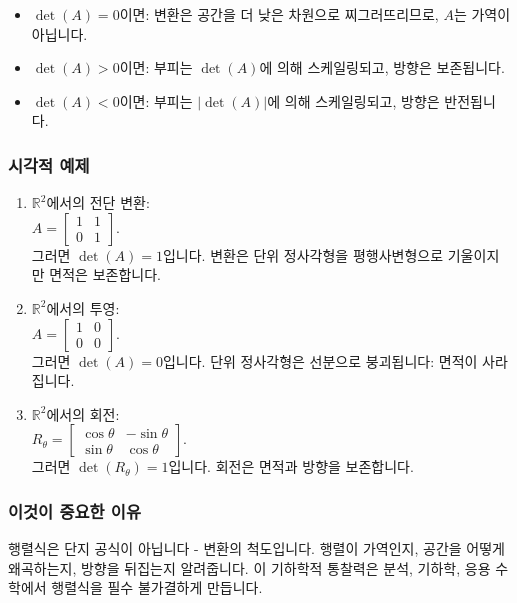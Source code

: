 \documentclass[
  12pt,
  a4paper,
]{article}
\begin{document}
\begin{itemize}
\item
  \(\det(A) = 0\)이면: 변환은 공간을 더 낮은 차원으로 찌그러뜨리므로, \(A\)는 가역이 아닙니다.
\item
  \(\det(A) > 0\)이면: 부피는 \(\det(A)\)에 의해 스케일링되고, 방향은 보존됩니다.
\item
  \(\det(A) < 0\)이면: 부피는 \(|\det(A)|\)에 의해 스케일링되고, 방향은 반전됩니다.
\end{itemize}

\subsubsection{시각적 예제}\label{visual-examples}

\begin{enumerate}
\def\labelenumi{\arabic{enumi}.}
\item
  \(\mathbb{R}^2\)에서의 전단 변환:\\
  \(A = \begin{bmatrix} 1 & 1 \\ 0 & 1 \end{bmatrix}\).\\
  그러면 \(\det(A) = 1\)입니다. 변환은 단위 정사각형을 평행사변형으로 기울이지만 면적은 보존합니다.
\item
  \(\mathbb{R}^2\)에서의 투영:\\
  \(A = \begin{bmatrix} 1 & 0 \\ 0 & 0 \end{bmatrix}\).\\
  그러면 \(\det(A) = 0\)입니다. 단위 정사각형은 선분으로 붕괴됩니다: 면적이 사라집니다.
\item
  \(\mathbb{R}^2\)에서의 회전:\\
  \(R_\theta = \begin{bmatrix} \cos\theta & -\sin\theta \\ \sin\theta & \cos\theta \end{bmatrix}\).\\
  그러면 \(\det(R_\theta) = 1\)입니다. 회전은 면적과 방향을 보존합니다.
\end{enumerate}

\subsubsection{이것이 중요한 이유}\label{why-this-matters-20}

행렬식은 단지 공식이 아닙니다 - 변환의 척도입니다. 행렬이 가역인지, 공간을 어떻게 왜곡하는지, 방향을 뒤집는지 알려줍니다. 이 기하학적 통찰력은 분석, 기하학, 응용 수학에서 행렬식을 필수 불가결하게 만듭니다.
\end{document}
